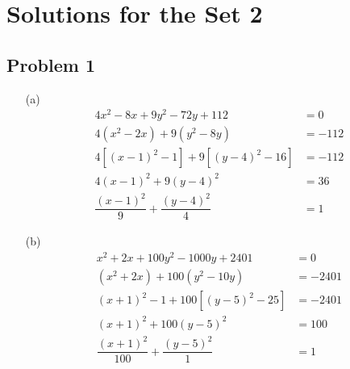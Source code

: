 \documentclass[12pt]{article}
\begin{document}
\section*{Solutions for the Set 2}
\subsection*{Problem 1}
\begin{enumerate}
    \item[(a)] 
    \begin{align*}
    4x^2 - 8x + 9y^2 - 72y + 112 &= 0 \\
    4(x^2 - 2x) + 9(y^2 - 8y) &= -112 \\
    4[(x - 1)^2 - 1] + 9[(y - 4)^2 - 16] &= -112 \\
    4(x - 1)^2 + 9(y - 4)^2 &= 36 \\
    \dfrac{(x - 1)^2}{9} + \dfrac{(y - 4)^2}{4} &= 1
    \end{align*}

    \item[(b)] 
    \begin{align*}
    x^2 + 2x + 100y^2 - 1000y + 2401 &= 0 \\
    (x^2 + 2x) + 100(y^2 - 10y) &= -2401 \\
    (x + 1)^2 - 1 + 100[(y - 5)^2 - 25] &= -2401 \\
    (x + 1)^2 + 100(y - 5)^2 &= 100 \\
    \dfrac{(x + 1)^2}{100} + \dfrac{(y - 5)^2}{1} &= 1
    \end{align*}
\end{enumerate}
\end{document}
